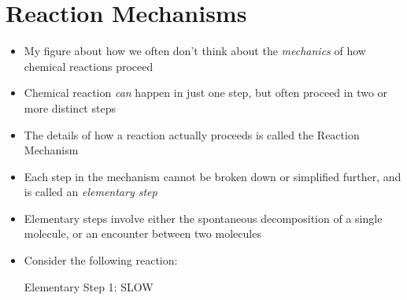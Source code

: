 \documentclass[12pt, openany, letterpaper]{memoir}
\begin{document}
\section{Reaction Mechanisms}
\begin{itemize}
  \item My figure about how we often don't think about the \emph{mechanics} of how chemical reactions proceed
	\item Chemical reaction \emph{can} happen in just one step, but often proceed in two or more distinct steps
	\item The details of how a reaction actually proceeds is called the Reaction Mechanism
	\item Each step in the mechanism cannot be broken down or simplified further, and is called an \emph{elementary step} 
	\item Elementary steps involve either the spontaneous decomposition of a single molecule, or an encounter between two molecules
	\item Consider the following reaction: 
	
	Elementary Step 1:  \hspace{1em} SLOW
	

\end{itemize}
\end{document}
